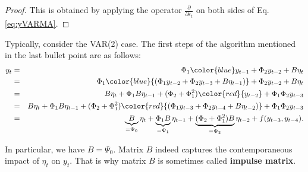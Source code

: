 \documentclass[
  12pt,
]{book}
\theoremstyle{definition}
\theoremstyle{definition}
\theoremstyle{definition}
\theoremstyle{definition}
\theoremstyle{remark}
\begin{document}
\begin{proof}
This is obtained by applying the operator \(\frac{\partial}{\partial \varepsilon_{t}}\) on both sides of Eq. \eqref{eq:yVARMA}.
\end{proof}

Typically, consider the VAR(2) case. The first steps of the algorithm mentioned in the last bullet point are as follows:
\begin{eqnarray*}
y_t &=& \Phi_1 {\color{blue}y_{t-1}} + \Phi_2 y_{t-2} + B \eta_t  \\
&=& \Phi_1 \color{blue}{(\Phi_1 y_{t-2} + \Phi_2 y_{t-3} + B \eta_{t-1})} + \Phi_2 y_{t-2} + B \eta_t  \\
&=& B \eta_t + \Phi_1 B \eta_{t-1} + (\Phi_2 + \Phi_1^2) \color{red}{y_{t-2}} + \Phi_1\Phi_2 y_{t-3}  \\
&=& B \eta_t + \Phi_1 B \eta_{t-1} + (\Phi_2 + \Phi_1^2) \color{red}{(\Phi_1 y_{t-3} + \Phi_2 y_{t-4} + B \eta_{t-2})} + \Phi_1\Phi_2 y_{t-3} \\
&=& \underbrace{B}_{=\Psi_0} \eta_t + \underbrace{\Phi_1 B}_{=\Psi_1} \eta_{t-1} + \underbrace{(\Phi_2 + \Phi_1^2)B}_{=\Psi_2} \eta_{t-2} + f(y_{t-3},y_{t-4}).
\end{eqnarray*}

In particular, we have \(B = \Psi_0\). Matrix \(B\) indeed captures the contemporaneous impact of \(\eta_t\) on \(y_t\). That is why matrix \(B\) is sometimes called \textbf{impulse matrix}.
\end{document}
